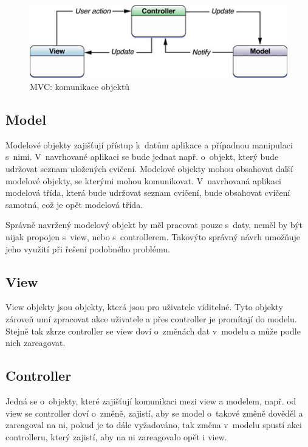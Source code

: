 \documentclass[thesis=B,czech]{FITthesis}[2012/06/26]
\begin{document}
	\begin{figure}[h!t]
		\centering
		\includegraphics[width=\textwidth]{img/model_view_controller}
		\caption{MVC: komunikace objektů \cite{appleMVCOnline}}
		\label{pic:mvc_communication}
	\end{figure}

	\subsection{Model}

	Modelové objekty zajišťují přístup k~datům aplikace a případnou manipulaci s~nimi. V~navrhované aplikaci se bude jednat např. o~objekt, který bude udržovat seznam uložených cvičení. Modelové objekty mohou obsahovat další modelové objekty, se kterými mohou komunikovat. V~navrhovaná aplikaci modelová třída, která bude udržovat seznam cvičení, bude obsahovat cvičení samotná, což je opět modelová třída.

	Správně navržený modelový objekt by měl pracovat pouze s~daty, neměl by být nijak propojen s~view, nebo s~controllerem. Takovýto správný návrh umožňuje jeho využití při řešení podobného problému.\cite{appleMVCOnline}

	\subsection{View}

	View objekty jsou objekty, která jsou pro uživatele viditelné. Tyto objekty zároveň umí zpracovat akce uživatele a přes controller je promítají do modelu. Stejně tak zkrze controller se view doví o~změnách dat v~modelu a může podle nich zareagovat.

	\subsection{Controller}

	Jedná se o~objekty, které zajišťují komunikaci mezi view a modelem, např. od view se controller doví o~změně, zajistí, aby se model o~takové změně dověděl a zareagoval na ni, pokud je to dále vyžadováno, tak změna v~modelu spustí akci controlleru, který zajistí, aby na ni zareagovalo opět i view.
\end{document}
